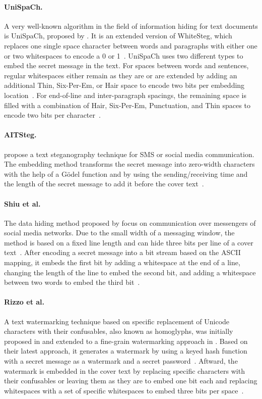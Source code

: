 	\paragraph{UniSpaCh.} A very well-known algorithm in the field of information hiding for text documents is UniSpaCh, proposed by \citet{Por.2012}. It is an extended version of WhiteSteg, which replaces one single space character between words and paragraphs with either one or two whitespaces to encode a 0 or 1~\citep{Por.2008}. UniSpaCh uses two different types to embed the secret message in the text. For spaces between words and sentences, regular whitespaces either remain as they are or are extended by adding an additional Thin, Six-Per-Em, or Hair space to encode two bits per embedding location~\citep{Por.2012}. For end-of-line and inter-paragraph spacings, the remaining space is filled with a combination of Hair, Six-Per-Em, Punctuation, and Thin spaces to encode two bits per character~\citep{Por.2012}.
	
	\paragraph{AITSteg.} \citet{Ahvanooey.2018} propose a text steganography technique for SMS or social media communication. The embedding method transforms the secret message into zero-width characters with the help of a Gödel function and by using the sending/receiving time and the length of the secret message to add it before the cover text~\citep{Ahvanooey.2018}.
	
	\paragraph{Shiu et al.} The data hiding method proposed by \citet{Shiu.2018} focus on communication over messengers of social media networks. Due to the small width of a messaging window, the method is based on a fixed line length and can hide three bits per line of a cover text~\citep{Shiu.2018}. After encoding a secret message into a bit stream based on the ASCII mapping, it embeds the first bit by adding a whitespace at the end of a line, changing the length of the line to embed the second bit, and adding a whitespace between two words to embed the third bit~\citep{Shiu.2018}.
	
	\paragraph{Rizzo et al.} A text watermarking technique based on specific replacement of Unicode characters with their confusables, also known as homoglyphs, was initially proposed in \citet{Rizzo.2016} and extended to a fine-grain watermarking approach in \citet{Rizzo.2019}. Based on their latest approach, it generates a watermark by using a keyed hash function with a secret message as a watermark and a secret password~\citep{Rizzo.2019}. Aftward, the watermark is embedded in the cover text by replacing specific characters with their confusables or leaving them as they are to embed one bit each and replacing whitespaces with a set of specific whitespaces to embed three bits per space~\citep{Rizzo.2019}.
	
